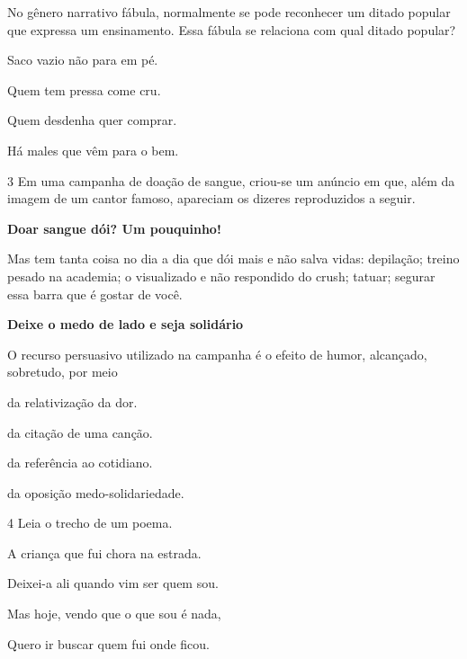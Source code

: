 No gênero narrativo fábula, normalmente se pode reconhecer um ditado
popular que expressa um ensinamento. Essa fábula se relaciona com qual ditado popular?

\begin{escolha}
\item Saco vazio não para em pé.

\item Quem tem pressa come cru.

\item Quem desdenha quer comprar.

\item Há males que vêm para o bem.
\end{escolha}

\num{3} Em uma campanha de doação de sangue, criou-se um anúncio em que, além da imagem de 
um cantor famoso, apareciam os dizeres reproduzidos a seguir.

\begin{center}
\begin{myquote}
\textbf{Doar sangue dói? Um pouquinho!}

Mas tem tanta coisa no dia a dia que dói mais e não salva vidas: depilação; treino pesado na academia; o 
visualizado e não respondido do crush; tatuar; segurar essa barra que é gostar de você.

\textbf{Deixe o medo de lado e seja solidário}
\end{myquote}
\end{center}


O recurso persuasivo utilizado na campanha é o efeito de humor, alcançado, sobretudo, por meio

\begin{escolha}
\item da relativização da dor.
\item da citação de uma canção.
\item da referência ao cotidiano.
\item da oposição medo-solidariedade.
\end{escolha}

\num{4} Leia o trecho de um poema.

\begin{myquote}
A criança que fui chora na estrada.

Deixei-a ali quando vim ser quem sou.

Mas hoje, vendo que o que sou é nada,

Quero ir buscar quem fui onde ficou.

\end{myquote}

